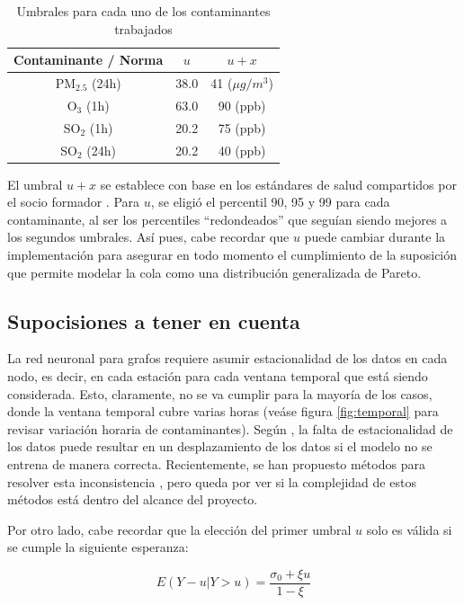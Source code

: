 \documentclass[11pt]{article}
\begin{document}
\begin{table}[H]
\centering
\small
\caption{Umbrales para cada uno de los contaminantes trabajados}
\vspace{5pt}
\label{tab:umbrales}
\begin{tabular}{c|cc}
\toprule
\textbf{ Contaminante / Norma } & $u$ & $u + x$ \\
\midrule
PM$_{2.5}$ (24h) & 38.0 & 41 ($\mu g/ m^3$) \\
O$_3$ (1h) & 63.0 & 90 (ppb) \\
SO$_2$ (1h) & 20.2 & 75 (ppb) \\
SO$_2$ (24h) & 20.2 & 40 (ppb)
\end{tabular}
\end{table}

El umbral $u + x$ se establece con base en los estándares de salud compartidos por el socio formador \citep{simapresentacion}. Para $u$, se eligió el percentil 90, 95 y 99 para cada contaminante, al ser los percentiles ``redondeados'' que seguían siendo mejores a los segundos umbrales. Así pues, cabe recordar que $u$ puede cambiar durante la implementación para asegurar en todo momento el cumplimiento de la suposición que permite modelar la cola como una distribución generalizada de Pareto. 

\subsection{Supocisiones a tener en cuenta}

La red neuronal para grafos requiere asumir estacionalidad de los datos en cada nodo, es decir, en cada estación para cada ventana temporal que está siendo considerada. Esto, claramente, no se va cumplir para la mayoría de los casos, donde la ventana temporal cubre varias horas (veáse figura \ref{fig:temporal} para revisar variación horaria de contaminantes). Según \citet{li2023graphneuralnetworkspatiotemporal}, la falta de estacionalidad de los datos puede resultar en un desplazamiento de los datos si el modelo no se entrena de manera correcta. Recientemente, se han propuesto métodos para resolver esta inconsistencia \citep{yuan2025nonstationary}, pero queda por ver si la complejidad de estos métodos está dentro del alcance del proyecto.

Por otro lado, cabe recordar que la elección del primer umbral $u$ solo es válida si se cumple la siguiente esperanza:

$$
E(Y -u | Y > u) = \frac{\sigma_0 + \xi u}{1 - \xi}
$$
\end{document}
